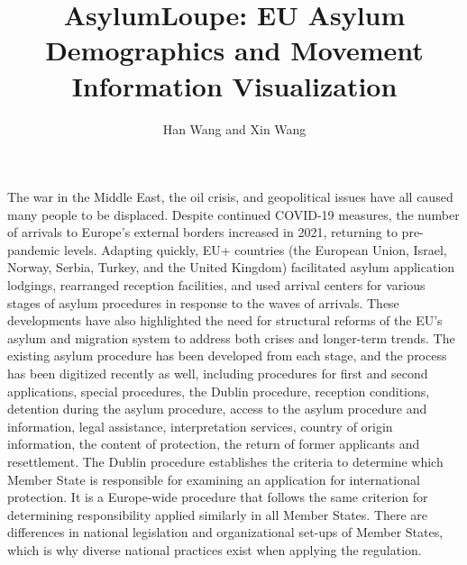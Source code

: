 \documentclass[journal]{vgtc}                %
\title{AsylumLoupe: EU Asylum Demographics and Movement Information Visualization}
\author{Han Wang and Xin Wang}
\begin{document}


\maketitle

The war in the Middle East, the oil crisis, and geopolitical issues have all caused many people to be displaced. Despite continued COVID-19 measures, the number of arrivals to Europe's external borders increased in 2021, returning to pre-pandemic levels. Adapting quickly, EU+ countries (the European Union, Israel, Norway, Serbia, Turkey, and the United Kingdom) facilitated asylum application lodgings, rearranged reception facilities, and used arrival centers for various stages of asylum procedures in response to the waves of arrivals\cite{euaa:2022}. These developments have also highlighted the need for structural reforms of the EU's asylum and migration system to address both crises and longer-term trends\cite{hurwitz:2009}. The existing asylum procedure has been developed from each stage, and the process has been digitized recently as well, including procedures for first and second applications, special procedures, the Dublin procedure, reception conditions, detention during the asylum procedure, access to the asylum procedure and information, legal assistance, interpretation services, country of origin information, the content of protection, the return of former applicants and resettlement. The Dublin procedure establishes the criteria to determine which Member State is responsible for examining an application for international protection. It is a Europe-wide procedure that follows the same criterion for determining responsibility applied similarly in all Member States. There are differences in national legislation and organizational set-ups of Member States, which is why diverse national practices exist when applying the regulation. 
\end{document}
